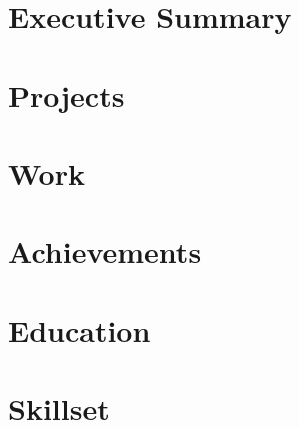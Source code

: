 \documentclass[12pt, a4paper, sans, obeyspaces, unicode]{moderncv}
\begin{document}
\maketitle

\vspace{0.5cm}

\section{Executive Summary}


\section{Projects}


\section{Work}


\section{Achievements}


\section{Education}


\section{Skillset}

\end{document}
